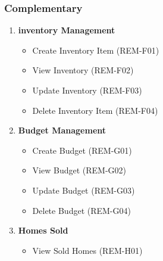 \documentclass[11pt]{article}
\begin{document}
			\subsubsection{Complementary}
			\begin{enumerate}[i]
				\item \textbf{inventory Management}
				\begin{itemize}
					\item Create Inventory Item (REM-F01)
					\item View Inventory (REM-F02)
					\item Update Inventory (REM-F03)
					\item Delete Inventory Item (REM-F04)
				\end{itemize}
				
				\item \textbf{Budget Management}
				\begin{itemize}
					\item Create Budget (REM-G01)
					\item View Budget (REM-G02)
					\item Update Budget (REM-G03)
					\item Delete Budget (REM-G04)
				\end{itemize}
				
				\item \textbf{Homes Sold}
				\begin{itemize}
					\item View Sold Homes (REM-H01)
				\end{itemize}
			\end{enumerate}
			
\end{document}
